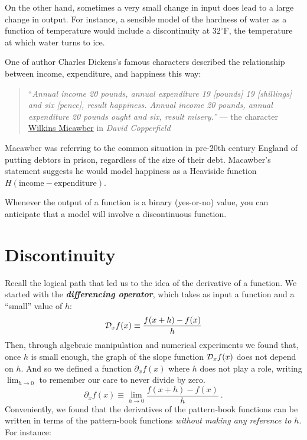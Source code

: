 \documentclass[
  letterpaper,
  DIV=11,
  numbers=noendperiod,
  oneside]{scrreprt}
\begin{document}
On the other hand, sometimes a very small change in input does lead to a
large change in output. For instance, a sensible model of the hardness
of water as a function of temperature would include a discontinuity at
\(32^\circ\)F, the temperature at which water turns to ice.

One of author Charles Dickens's famous characters described the
relationship between income, expenditure, and happiness this way:

\begin{quote}
``\emph{Annual income 20 pounds, annual expenditure 19 {[}pounds{]} 19
{[}shillings{]} and six {[}pence{]}, result happiness. Annual income 20
pounds, annual expenditure 20 pounds ought and six, result misery.''}
--- the character
\href{https://en.wikipedia.org/wiki/Wilkins_Micawber}{Wilkins Micawber}
in \emph{David Copperfield}
\end{quote}

Macawber was referring to the common situation in pre-20th century
England of putting debtors in prison, regardless of the size of their
debt. Macawber's statement suggests he would model happiness as a
Heaviside function \(H(\text{income}- \text{expenditure})\).

Whenever the output of a function is a binary (yes-or-no) value, you can
anticipate that a model will involve a discontinuous function.

\hypertarget{discontinuity}{%
\section{Discontinuity}\label{discontinuity}}

Recall the logical path that led us to the idea of the derivative of a
function. We started with the \textbf{\emph{differencing operator}},
which takes as input a function and a ``small'' value of \(h\):
\[{\cal D}_x f(x) \equiv \frac{f(x+h) - f(x)}{h}\] Then, through
algebraic manipulation and numerical experiments we found that, once
\(h\) is small enough, the graph of the slope function
\({\cal D}_x f(x)\) does not depend on \(h\). And so we defined a
function \(\partial_x f(x)\) where \(h\) does not play a role, writing
\(\lim_{h\rightarrow 0}\) to remember our care to never divide by zero.
\[\partial_x f(x) \equiv \lim_{h\rightarrow 0} \frac{f(x+h) - f(x)}{h}\ .\]
Conveniently, we found that the derivatives of the pattern-book
functions can be written in terms of the pattern-book functions
\emph{without making any reference to \(h\)}. For instance:
\end{document}
